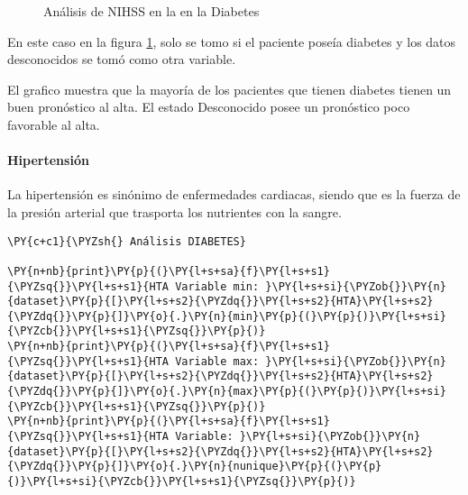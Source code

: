 \begin{center}
    	\begin{figure}[H]
	\centering
	\caption{Análisis de NIHSS en la en la Diabetes}
	\label{fig:aNISSd}
	\end{figure}
\end{center}
    
    En este caso en la figura \ref{fig:aNISSd}, solo se tomo si el paciente poseía diabetes y los datos
desconocidos se tomó como otra variable.

El grafico muestra que la mayoría de los pacientes que tienen diabetes
tienen un buen pronóstico al alta. El estado Desconocido posee un
pronóstico poco favorable al alta.

    \hypertarget{hipertensiuxf3n}{%
\paragraph{Hipertensión}\label{hipertensiuxf3n}}

La hipertensión es sinónimo de enfermedades cardiacas, siendo que es la
fuerza de la presión arterial que trasporta los nutrientes con la
sangre.

    \begin{tcolorbox}[breakable, size=fbox, boxrule=1pt, pad at break*=1mm,colback=cellbackground, colframe=cellborder]
\begin{Verbatim}[commandchars=\\\{\}]
\PY{c+c1}{\PYZsh{} Análisis DIABETES}

\PY{n+nb}{print}\PY{p}{(}\PY{l+s+sa}{f}\PY{l+s+s1}{\PYZsq{}}\PY{l+s+s1}{HTA Variable min: }\PY{l+s+si}{\PYZob{}}\PY{n}{dataset}\PY{p}{[}\PY{l+s+s2}{\PYZdq{}}\PY{l+s+s2}{HTA}\PY{l+s+s2}{\PYZdq{}}\PY{p}{]}\PY{o}{.}\PY{n}{min}\PY{p}{(}\PY{p}{)}\PY{l+s+si}{\PYZcb{}}\PY{l+s+s1}{\PYZsq{}}\PY{p}{)}
\PY{n+nb}{print}\PY{p}{(}\PY{l+s+sa}{f}\PY{l+s+s1}{\PYZsq{}}\PY{l+s+s1}{HTA Variable max: }\PY{l+s+si}{\PYZob{}}\PY{n}{dataset}\PY{p}{[}\PY{l+s+s2}{\PYZdq{}}\PY{l+s+s2}{HTA}\PY{l+s+s2}{\PYZdq{}}\PY{p}{]}\PY{o}{.}\PY{n}{max}\PY{p}{(}\PY{p}{)}\PY{l+s+si}{\PYZcb{}}\PY{l+s+s1}{\PYZsq{}}\PY{p}{)}
\PY{n+nb}{print}\PY{p}{(}\PY{l+s+sa}{f}\PY{l+s+s1}{\PYZsq{}}\PY{l+s+s1}{HTA Variable: }\PY{l+s+si}{\PYZob{}}\PY{n}{dataset}\PY{p}{[}\PY{l+s+s2}{\PYZdq{}}\PY{l+s+s2}{HTA}\PY{l+s+s2}{\PYZdq{}}\PY{p}{]}\PY{o}{.}\PY{n}{nunique}\PY{p}{(}\PY{p}{)}\PY{l+s+si}{\PYZcb{}}\PY{l+s+s1}{\PYZsq{}}\PY{p}{)}
\end{Verbatim}
\end{tcolorbox}

